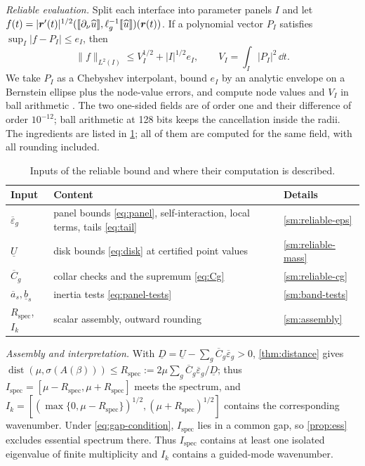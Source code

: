 \emph{Reliable evaluation.} Split each interface into parameter panels $I$ and let
$f(t)=|\boldsymbol r'(t)|^{1/2}(\llbracket \partial_\nu\widehat u\rrbracket,
\ell_g^{-1}\llbracket \widehat u\rrbracket)(\boldsymbol r(t))$. If a polynomial vector $P_I$
satisfies $\sup_I|f-P_I|\le e_I$, then
\begin{equation}\label{eq:panel}
  \|f\|_{L^2(I)}\le V_I^{1/2}+|I|^{1/2}e_I,\qquad V_I=\int_I|P_I|^2\,\dd t .
\end{equation}
We take $P_I$ as a Chebyshev interpolant, bound $e_I$ by an analytic envelope on
a Bernstein ellipse plus the node-value errors, and compute node values and $V_I$
in ball arithmetic \cite{Johansson2017}. The two one-sided fields are of order
one and their difference of order $10^{-12}$; ball arithmetic at 128 bits keeps
the cancellation inside the radii. The ingredients are listed in
\cref{tab:inputs}; all of them are computed for the same field, with all
rounding included.

\begin{table}[tbhp]
\caption{Inputs of the reliable bound and where their computation is described.}
\label{tab:inputs}
\centering\small
\begin{tabular}{lp{}l}
\toprule
Input & Content & Details\\
\midrule
$\overline\varepsilon_g$ & panel bounds \eqref{eq:panel}, self-interaction, local terms, tails \eqref{eq:tail} & \cref{sm:reliable-eps}\\
$\underline U$ & disk bounds \eqref{eq:disk} at certified point values & \cref{sm:reliable-mass}\\
$\overline C_g$ & collar checks and the supremum \eqref{eq:Cg} & \cref{sm:reliable-cg}\\
$\overline a_s,\underline b_s$ & inertia tests \eqref{eq:panel-tests} & \cref{sm:band-tests}\\
$R_{\mathrm{spec}}$, $I_k$ & scalar assembly, outward rounding & \cref{sm:assembly}\\
\bottomrule
\end{tabular}
\end{table}

\emph{Assembly and interpretation.} With $\underline D=\underline U-\sum_g
\overline C_g\overline\varepsilon_g>0$, \cref{thm:distance} gives
$\operatorname{dist}(\mu,\sigma(A(\beta)))\le R_{\mathrm{spec}}:=2\mu\sum_g
\overline C_g\overline\varepsilon_g/\underline D$; thus
$I_{\mathrm{spec}}=[\mu-R_{\mathrm{spec}},\mu+R_{\mathrm{spec}}]$ meets the
spectrum, and $I_k=[(\max\{0,\mu-R_{\mathrm{spec}}\})^{1/2},(\mu+R_{\mathrm{spec}})^{1/2}]$
contains the corresponding wavenumber. Under \eqref{eq:gap-condition}, $I_{\mathrm{spec}}$ lies in a
common gap, so \cref{prop:ess} excludes essential spectrum there. Thus
$I_{\mathrm{spec}}$ contains at least one isolated eigenvalue of finite
multiplicity and $I_k$ contains a guided-mode wavenumber.
